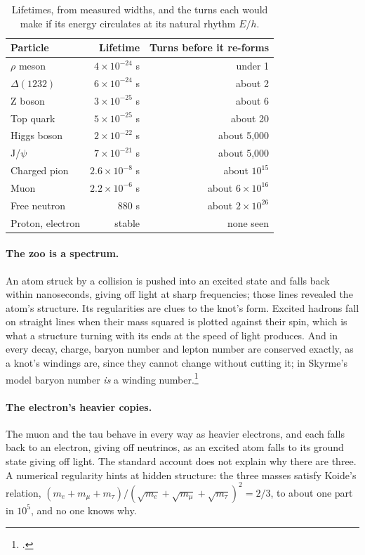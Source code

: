 \documentclass[11pt,a4paper]{article}
\newcommand{\fn}[1]{\footnote{\citealp{#1}.}}
\begin{document}
\begin{table}[H]
\centering
\small
\renewcommand{\arraystretch}{1.2}
\begin{tabular}{@{}lrr@{}}
\toprule
\textbf{Particle} & \textbf{Lifetime} & \textbf{Turns before it re-forms} \\
\midrule
$\rho$ meson & $4\times10^{-24}$ s & under 1 \\
$\Delta(1232)$ & $6\times10^{-24}$ s & about 2 \\
Z boson & $3\times10^{-25}$ s & about 6 \\
Top quark & $5\times10^{-25}$ s & about 20 \\
Higgs boson & $2\times10^{-22}$ s & about 5{,}000 \\
J/$\psi$ & $7\times10^{-21}$ s & about 5{,}000 \\
Charged pion & $2.6\times10^{-8}$ s & about $10^{15}$ \\
Muon & $2.2\times10^{-6}$ s & about $6\times10^{16}$ \\
Free neutron & 880 s & about $2\times10^{26}$ \\
Proton, electron & stable & none seen \\
\bottomrule
\end{tabular}
\caption{Lifetimes, from measured widths, and the turns each would make if its energy circulates at its natural rhythm $E/h$. \hyptag}
\label{tab:turns}
\end{table}

\paragraph{The zoo is a spectrum.} An atom struck by a collision is pushed into an excited state and falls back within nanoseconds, giving off light at sharp frequencies; those lines revealed the atom's structure.  Its regularities are clues to the knot's form. Excited hadrons fall on straight lines when their mass squared is plotted against their spin, which is what a structure turning with its ends at the speed of light produces. And in every decay, charge, baryon number and lepton number are conserved exactly, as a knot's windings are, since they cannot change without cutting it; in Skyrme's model baryon number \emph{is} a winding number.\fn{skyrme1962}

\paragraph{The electron's heavier copies.} The muon and the tau behave in every way as heavier electrons, and each falls back to an electron, giving off neutrinos, as an excited atom falls to its ground state giving off light.  The standard account does not explain why there are three. A numerical regularity hints at hidden structure: the three masses satisfy Koide's relation, $(m_e + m_\mu + m_\tau)/(\sqrt{m_e}+\sqrt{m_\mu}+\sqrt{m_\tau})^2 = 2/3$, to about one part in $10^5$, and no one knows why. 
\end{document}
